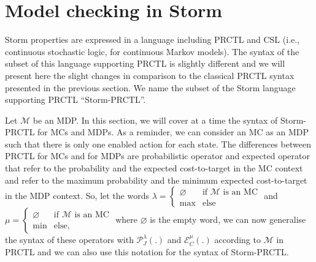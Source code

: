 \section{Model checking in Storm}
Storm properties are expressed in a language including PRCTL and CSL (i.e., continuous stochastic logic, for continuous Markov models).
The syntax of the subset of this language supporting PRCTL is slightly different and we will present here the slight changes in comparison to the classical PRCTL syntax presented in the previous section. We name the subset of the Storm language supporting PRCTL ``Storm-PRCTL''.

\begin{notation}
  Let $\mathcal{M}$ be an MDP. In this section, we will cover at a time the syntax of Storm-PRCTL for MCs and MDPs.
  As a reminder, we can consider an MC as an MDP such that there is only one enabled action for each state.
  The differences between PRCTL for MCs and for MDPs are probabilistic operator and expected operator that refer to the probability and the expected cost-to-target in the MC context and refer to the maximum probability and the minimum expected cost-to-target in the MDP context.
  So, let the words
  $\lambda = \begin{cases}
    \varnothing &\text{if } \mathcal{M} \text{ is an MC}\\
    \max & \text{else}
  \end{cases}$ and
  $\mu = \begin{cases}
    \varnothing &\text{if } \mathcal{M} \text{ is an MC}\\
    \min & \text{else},
  \end{cases}$ where $\varnothing$ is the empty word, we can now generalise the syntax of these operators with $\mathcal{P}^\lambda_J(.)$ and $\mathcal{E}^\mu_C(.)$ according to $\mathcal{M}$ in PRCTL and we can also use this notation for the syntax of Storm-PRCTL.
\end{notation}


